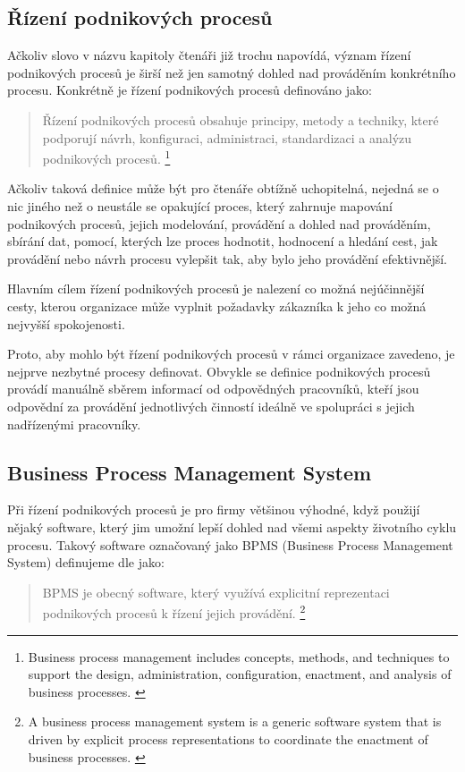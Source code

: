 \documentclass[]{article}
\begin{document}
\subsection{Řízení podnikových procesů}
Ačkoliv slovo  v názvu kapitoly čtenáři již trochu napovídá, význam řízení podnikových procesů je širší než jen samotný dohled nad prováděním konkrétního procesu. Konkrétně je řízení podnikových procesů definováno jako: \cite{Weske2007}

\begin{quote}
Řízení podnikových procesů obsahuje principy, metody a techniky, které podporují návrh, konfiguraci, administraci, standardizaci a analýzu podnikových procesů.
\footnote{Business process management includes concepts, methods, and techniques to support the design, administration, configuration, enactment, and analysis of business processes. \cite{Weske2007}}
\end{quote}

Ačkoliv taková definice může být pro čtenáře obtížně uchopitelná, nejedná se o nic jiného než o neustále se opakující proces, který zahrnuje mapování podnikových procesů, jejich modelování, provádění a dohled nad prováděním, sbírání dat, pomocí, kterých lze proces hodnotit, hodnocení a hledání cest, jak provádění nebo návrh procesu vylepšit tak, aby bylo jeho provádění efektivnější.

Hlavním cílem řízení podnikových procesů je nalezení co možná nejúčinnější cesty, kterou organizace může vyplnit požadavky zákazníka k jeho co možná nejvyšší spokojenosti. \cite{Jedlitschka2010}

Proto, aby mohlo být řízení podnikových procesů v rámci organizace zavedeno, je nejprve nezbytné procesy definovat. Obvykle se definice podnikových procesů provádí manuálně sběrem informací od odpovědných pracovníků, kteří jsou odpovědní za provádění jednotlivých činností ideálně ve spolupráci s jejich nadřízenými pracovníky.

\subsection{Business Process Management System}
Při řízení podnikových procesů je pro firmy většinou výhodné, když použijí nějaký software, který jim umožní lepší dohled nad všemi aspekty životního cyklu procesu. Takový software označovaný jako BPMS (Business Process Management System) definujeme dle \cite{Weske2007} jako:

\begin{quote}
BPMS je obecný software, který využívá explicitní reprezentaci podnikových procesů k řízení jejich provádění.
\footnote{A business process management system is a generic software system that is driven by explicit process representations to coordinate the enactment of business processes. \cite{Weske2007}}
\end{quote}
\end{document}
